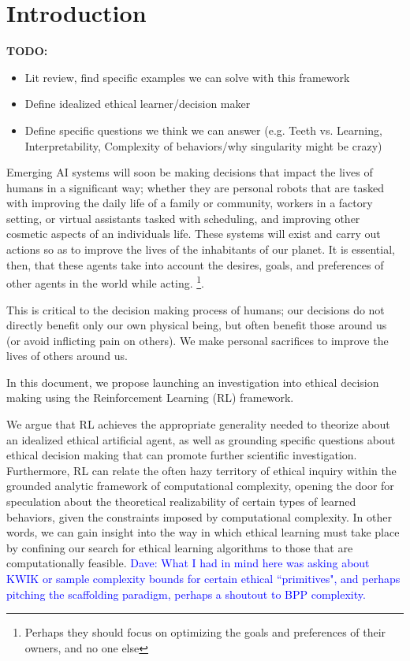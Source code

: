 \documentclass[11pt]{article}
\newcommand\davenote[1]{\textcolor{blue}{Dave: #1}}
\begin{document}
\section{Introduction}

{\bf TODO:}
\begin{itemize}
\item Lit review, find specific examples we can solve with this framework
\item Define idealized ethical learner/decision maker
\item Define specific questions we think we can answer (e.g. Teeth vs. Learning, Interpretability, Complexity of behaviors/why singularity might be crazy)
\end{itemize}

Emerging AI systems will soon be making decisions that impact the lives of humans in a significant way; whether they are personal robots that are tasked with improving the daily life of a family or community,  workers in a factory setting, or virtual assistants tasked with scheduling, and improving other cosmetic aspects of an individuals life.
These systems will exist and carry out actions so as to improve the lives of the inhabitants of our planet.
It is essential, then, that these agents take into account the desires, goals, and preferences of other agents in the world while acting. \footnote{Perhaps they should focus on optimizing the goals and preferences of their owners, and no one else}.

This is critical to the decision making process of humans; our decisions do not directly benefit only our own physical being, but often benefit those around us (or avoid inflicting pain on others). We make personal sacrifices to improve the lives of others around us.

In this document, we propose launching an investigation into ethical decision making using the Reinforcement Learning (RL) framework.

We argue that RL achieves the appropriate generality needed to theorize about an idealized ethical artificial agent, as well as grounding specific questions about ethical decision making that can promote further scientific investigation.
Furthermore, RL can relate the often hazy territory of ethical inquiry within the grounded analytic framework of computational complexity, opening the door for speculation about the theoretical realizability of certain types of learned behaviors, given the constraints imposed by computational complexity.
In other words, we can gain insight into the way in which ethical learning must take place by confining our search for ethical learning algorithms to those that are computationally feasible. \davenote{What I had in mind here was asking about KWIK or sample complexity bounds for certain ethical ``primitives", and perhaps pitching the scaffolding paradigm, perhaps a shoutout to BPP complexity.}
\end{document}
